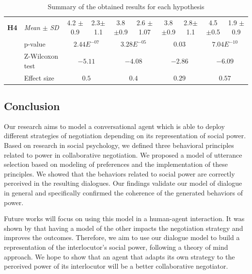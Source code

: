 \documentclass{llncs}
\begin{document}
\begin{table}[t]
{\begin{tabular}{|ll|c|c|c|c|c|c|c|c|}
						\newline \multirow{4}{*} {\textbf{H4}} & \multicolumn{1}{|l|}{ \textit{Mean} $\pm$ \textit{SD} } & 4.2 $\pm$ 0.9 & 2.3$\pm$ 1.1  & 3.8 $\pm$0.9 & 2.6 $\pm$1.07 & 3.8 $\pm$0.9  & 2.8$\pm$ 1.1  & 4.5 $\pm$0.5  & 1.9 $\pm$ 0.9\\
						\cline{2-10}
						\newline & \multicolumn{1}{|l|}{p-value} & \multicolumn{2}{c|}{ $2.44E^{-07}$} & \multicolumn{2}{c|}{ $3.28E^{-05}$} & \multicolumn{2}{c|}{ $0.03$}& \multicolumn{2}{c|}{ $7.04E^{-10}$}\\
						\cline{2-10}	
						\newline & \multicolumn{1}{|l|}{Z-Wilcoxon test} & \multicolumn{2}{c|}{ $-5.11$} & \multicolumn{2}{c|}{ $-4.08$} & \multicolumn{2}{c|}{ $-2.86$}& \multicolumn{2}{c|}{ $-6.09$}\\
						\cline{2-10}	
						\newline & \multicolumn{1}{|l|}{Effect size} & \multicolumn{2}{c|}{ $0.5$} & \multicolumn{2}{c|}{ $0.4$} & \multicolumn{2}{c|}{ $0.29$}& \multicolumn{2}{c|}{ $0.57$}\\
						\hline	
					\end{tabular}
				}
				\caption{Summary of the obtained results for each hypothesis}
				\label{res}
			\end{table}
			
			\subsection{Conclusion}
			
			Our research aims to model a conversational agent which is able to deploy different strategies of negotiation depending on its representation of social power. Based on research in social psychology, we defined three behavioral principles related to power in collaborative negotiation. We proposed a model of utterance selection based on modeling of preferences and the implementation of these principles. We showed that the behaviors related to social power are correctly perceived in the resulting dialogues. Our findings validate our model of dialogue in general and specifically confirmed the coherence of the generated behaviors of power.
			
			Future works will focus on using this model in a human-agent interaction. It was shown by \cite{klatt2011negotiations} that having a model of the other impacts the negotiation strategy and improves the outcomes. Therefore, we aim to use our dialogue model to build a representation of the interlocutor's social power, following a theory of mind approach. We hope to show that an agent that adapts its own strategy to the perceived power of its interlocutor will be a better collaborative negotiator.		
			
			
			
			\scriptsize{	
				
				}
			
			
			
		
\end{document}
